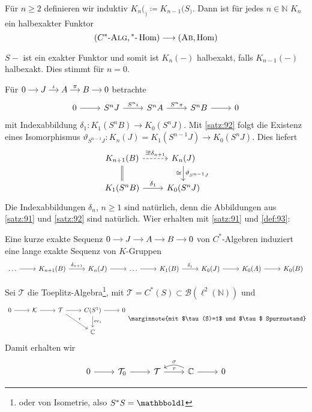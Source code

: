 \begin{definitionP}[label=def:93]
	Für $n \ge 2$ definieren wir induktiv $K_n(_) \coloneqq K_{n-1}(S_)$.
	Dann ist für jedes $n \in \mathbb{N}$ $K_n$ ein halbexakter Funktor
	\[
		\enbrace*{\CSTAR, {^*}\text{-}\Hom} \longrightarrow \enbrace*{\AB, \Hom}
	\]
\end{definitionP}
\begin{beweis}
	$S-$ ist ein exakter Funktor und somit ist $K_n(-)$ halbexakt, falls $K_{n-1}(-)$ halbexakt.
	Dies stimmt für $n=0$.
\end{beweis}

Für \(
	\begin{tikzcd}[cramped,sep=small]
		0 \rar & J \rar["\iota"] & A \rar["\pi"] & B \rar & 0
	\end{tikzcd}
\) betrachte 
\[
	\begin{tikzcd}
		0 \rar & S^n J \rar["S^n \iota"] & S^n A \rar["S^n \pi"] & S^n B \rar & 0
	\end{tikzcd}
\]
mit Indexabbildung $\delta_1 \colon K_1(S^n B) \to K_0(S^n J)$.
Mit \autoref{satz:92} folgt die Existenz eines Isomorphismus $\vartheta_{S^{n-1}J} \colon K_n(J) = K_1(S^{n-1}J) \to K_0(S^n J)$.
Dies liefert
\[
	\begin{tikzcd}
		K_{n+1}(B) \rar[dashed,"\exists! \delta_{n+1}"] & K_n(J) \dar["\cong"',"\vartheta_{S^{n-1}J}"] \\
		K_1(S^n B) \uar[equal] \rar["\delta_1"] & K_0(S^n J)
	\end{tikzcd}
\]
Die Indexabbildungen $\delta_n$, $n \ge 1$ sind natürlich, denn die Abbildungen aus \autoref{satz:91} und \autoref{satz:92} sind natürlich.
Wier erhalten mit \autoref{satz:91} und \autoref{def:93}:

\begin{proposition}[label=prop:94]
	Eine kurze exakte Sequenz \(
		\begin{tikzcd}[cramped,sep=small]
			0 \rar & J \rar & A \rar & B \rar & 0
		\end{tikzcd}
	\)
	von $C^*$-Algebren induziert eine lange exakte Sequenz von $K$-Gruppen
	\[
		\begin{tikzcd}
			\ldots \rar & K_{n+1}(B) \rar["\delta_{n+1}"] & K_n(J) \rar & \ldots \rar & K_1(B) \rar["\delta_1"] & K_0(J) \rar & K_0(A) \rar & K_0(B)
		\end{tikzcd}
	\]
\end{proposition}

Sei $\mathcal{T}$ die Toeplitz-Algebra\footnote{oder von Isometrie, also $S^*S=\ind$}, mit $\mathcal{T} = C^*(S) \subset \mathcal{B}(\ell^2(\mathbb{N}))$ und 
\[
	\begin{tikzcd}
		0 \rar & \mathcal{K} \rar & \mathcal{T} \rar \drar["\tau"] & C(S^1) \dar["\ev_1"] \rar & 0 \\
		& & & \mathbb{C}
	\end{tikzcd}\marginnote{mit $\tau(S)=1$ und $\tau$ Spurzustand}
\]
Damit erhalten wir 
\[
	\begin{tikzcd}
		0 \rar & \mathcal{T}_0 \rar & \mathcal{T} \rar["\tau"] & \mathbb{C} \lar[bend right,"\sigma"'] \rar & 0
	\end{tikzcd}
\]

